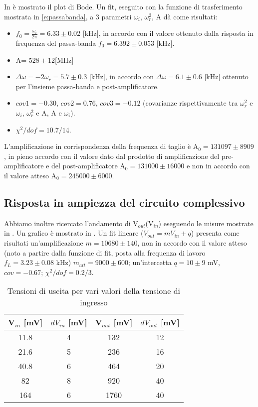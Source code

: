 In  è mostrato il plot di Bode. Un fit, eseguito con la funzione di trasferimento mostrata in \ref{e:passabanda}, a 3 parametri $\omega_i$, $\omega_r^2$, A dà come risultati:
\begin{itemize}
\item $f_0=\frac{\omega_i}{2\pi}= 6.33 \pm 0.02$ [kHz], in accordo con il valore ottenuto dalla risposta in frequenza del passa-banda $f_0 = 6.392 \pm 0.053$ [kHz].
\item A= $528 \pm 12$[MHz]
\item $\Delta \omega =-2\omega_r=  5.7 \pm 0.3$ [kHz], in accordo con $\Delta \omega = 6.1 \pm 0.6$ [kHz] ottenuto per l'insieme passa-banda e post-amplificatore.
\item $cov1 = -0.30$, $cov2 = 0.76$, $cov3 = -0.12$ (covarianze rispettivamente tra $\omega_r^2$ e $\omega_i$, $\omega_r^2$ e A, A e $\omega_i$).
\item $\chi^2/dof = 10.7/14$.
\end{itemize}
L'amplificazione in corrispondenza della frequenza di taglio è A$_0 = 131097 \pm 8909$, in pieno accordo con il valore dato dal prodotto di amplificazione del pre-amplificatore e del post-amplificatore A$_0 = 131000 \pm 16000$ e non in accordo con il valore atteso A$_0 = 245000 \pm 6000$.

\subsection{Risposta in ampiezza del circuito complessivo}
Abbiamo inoltre ricercato l'andamento di V$_{out}$(V$_{in}$) eseguendo le misure mostrate in . Un grafico è mostrato in . Un fit lineare ($V_{out}= mV_{in} + q$) presenta come risultati un'amplificazione $m = 10680 \pm 140$, non in accordo con il valore atteso (noto a partire dalla funzione di fit, posta alla frequenza di lavoro $f_L = 3.23 \pm 0.08$ kHz) $m_{att} = 9000 \pm 600$; un'intercetta $q = 10 \pm 9$ mV, $cov = -0.67$; $\chi^2 /dof = 0.2/3$.
\begin{table}[h]
	\centering
	\begin{tabular}{cccc}		
		 {V$_{in}$ [mV]} & {$dV_{in}$ [mV]} & {V$_{out}$ [mV]} & {$dV_{out}$ [mV]} \\
		 \midrule
                       11.8 & 4 & 132 & 12 \\
                       21.6 & 5 & 236 & 16 \\
                       40.8 & 6 & 464 & 20 \\
                       82 & 8 & 920 &40 \\
                       164 & 6 & 1760 & 40 \\
 	\end{tabular}
	\caption{Tensioni di uscita per vari valori della tensione di ingresso}
	\label{t:risposta_ampiezza}
\end{table}

